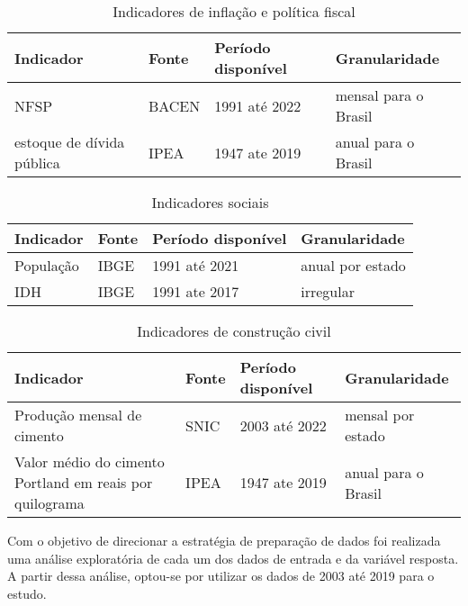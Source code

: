 \begin{table}[H]
    \centering
    \caption{Indicadores de inflação e política fiscal}
    \begin{tabular}{llll}
        \toprule
        Indicador                   & Fonte & Período disponível & Granularidade         \\
        \midrule
        NFSP                        & BACEN  & 1991 até 2022      & mensal para o Brasil      \\
        estoque de dívida pública   & IPEA   & 1947 ate 2019      & anual para o Brasil      \\
        \bottomrule
    \end{tabular}
\end{table}

\begin{table}[H]
    \centering
    \caption{Indicadores sociais}
    \begin{tabular}{llll}
        \toprule
        Indicador                   & Fonte & Período disponível & Granularidade         \\
        \midrule
        População                   & IBGE   & 1991 até 2021      & anual por estado      \\
        IDH                         & IBGE   & 1991 ate 2017      & irregular      \\
        \bottomrule
    \end{tabular}
\end{table}


\begin{table}[H]
    \centering
    \caption{Indicadores de construção civil}
    \begin{tabular}{llll}
        \toprule
        Indicador                   & Fonte & Período disponível & Granularidade         \\
        \midrule
        Produção mensal de cimento  & SNIC  & 2003 até 2022      & mensal por estado      \\
        Valor médio do cimento Portland em reais por quilograma   & IPEA   & 1947 ate 2019      & anual para o Brasil      \\
        \bottomrule
    \end{tabular}
\end{table}

Com o objetivo de direcionar a estratégia de preparação de dados
foi realizada uma análise exploratória de cada um dos dados de 
entrada e da variável resposta. A partir dessa análise, 
optou-se por utilizar os dados de 2003 até 2019 para o estudo.

